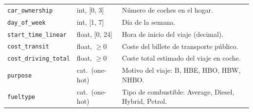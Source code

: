 \begin{table}[htbp]
\begin{tabular}{llp{5.5cm}}
    \texttt{car\_ownership}        & int, [0, 3]      & Número de coches en el hogar. \\
    \texttt{day\_of\_week}         & int, [1, 7]      & Día de la semana. \\
    \texttt{start\_time\_linear}   & float, [0, 24]   & Hora de inicio del viaje (decimal). \\
    \texttt{cost\_transit}         & float, $\geq 0$  & Coste del billete de transporte público. \\
    \texttt{cost\_driving\_total}  & float, $\geq 0$  & Coste total estimado del viaje en coche. \\
    \texttt{purpose}               & cat.\ (one-hot)  & Motivo del viaje: B, HBE, HBO, HBW, NHBO. \\
    \texttt{fueltype}              & cat.\ (one-hot)  & Tipo de combustible: Average, Diesel, Hybrid, Petrol. \\
    \bottomrule
  \end{tabular}
\end{table}